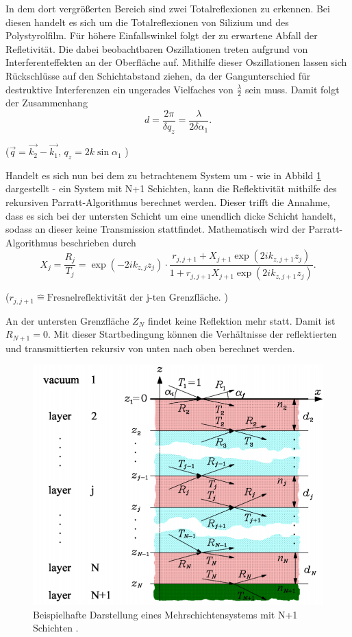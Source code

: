 In dem dort vergrößerten Bereich sind zwei Totalreflexionen zu erkennen. Bei diesen handelt es sich um die Totalreflexionen von Silizium und des Polystyrolfilm. Für höhere Einfallswinkel folgt der zu erwartene Abfall der Refletivität. Die dabei beobachtbaren Oszillationen treten aufgrund von Interferenteffekten an der Oberfläche auf. Mithilfe dieser Oszillationen lassen sich Rückschlüsse auf den Schichtabstand ziehen, da der Gangunterschied für destruktive Interferenzen ein ungerades Vielfaches von $\frac{\lambda}{2}$ sein muss.
Damit folgt der Zusammenhang
\begin{equation*}
    d = \frac{2 \pi}{\delta q_z} = \frac{\lambda}{2\delta \alpha_1} .
\end{equation*}
\begin{center}
   \tiny{ ($\vec{q} = \vec{k_2}-\vec{k_1}$, $ q_z = 2k \sin{\alpha_1} $ ) }
\end{center}
Handelt es sich nun bei dem zu betrachtenem System um - wie in Abbild \ref{fig:layer} dargestellt - ein System mit N+1 Schichten, kann die Reflektivität mithilfe des rekursiven Parratt-Algorithmus berechnet werden. Dieser trifft die Annahme, dass es sich bei der untersten Schicht um eine unendlich dicke Schicht handelt, sodass an dieser keine Transmission stattfindet.
Mathematisch wird der Parratt-Algorithmus beschrieben durch
\begin{equation}
    X_j=\frac{R_j}{T_j}=\exp(-2ik_{z,j}z_j)\cdot\frac{r_{j,j+1}+X_{j+1}\exp(2ik_{z,j+1}z_j)}{1+r_{j,j+1}X_{j+1}\exp(2ik_{z,j+1}z_j)}.
    \label{eqn:parratt}
\end{equation}
\begin{center}
    \tiny{($r_{j,j+1} \hat{=} \text{Fresnelreflektivität der j-ten Grenzfläche.}$ )}    
\end{center}
An der untersten Grenzfläche $Z_N$ findet keine Reflektion mehr statt. Damit ist $R_{N+1} = 0$. Mit dieser Startbedingung können die Verhältnisse der reflektierten und transmittierten rekursiv von unten nach oben berechnet werden. 
\begin{figure}[H]
    \centering
    \includegraphics[width = 0.8 \textwidth]{content/images/layers.png}
    \caption{Beispielhafte Darstellung eines Mehrschichtensystems mit N+1 Schichten \cite{e1}. }
    \label{fig:layer}
\end{figure}



